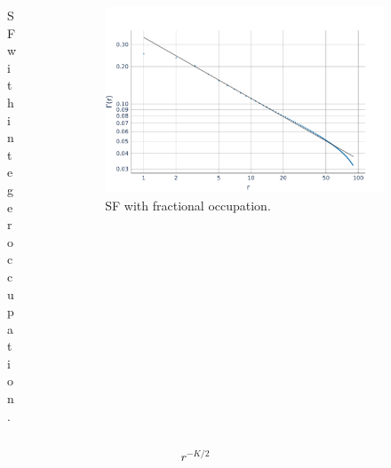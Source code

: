 \documentclass[aspectratio=169]{beamer}
\begin{document}
\begin{frame}
\begin{onlyenv}
\begin{columns}[onlytextwidth]
\begin{column}{0.5\textwidth}
\begin{figure}[ht]
          \caption*{SF with integer occupation.}
        \end{figure}
      \end{column}
      \begin{column}{0.5\textwidth}
        \begin{figure}[ht]
          \centering
          \includegraphics[scale=0.2]{../img/Correlations-SF2.pdf}
          \caption*{SF with fractional occupation.}
        \end{figure}
      \end{column}
    \end{columns}
    \begin{equation}
      r^{-K/2}
    \end{equation}
  \end{onlyenv}
\end{frame}
\end{document}
